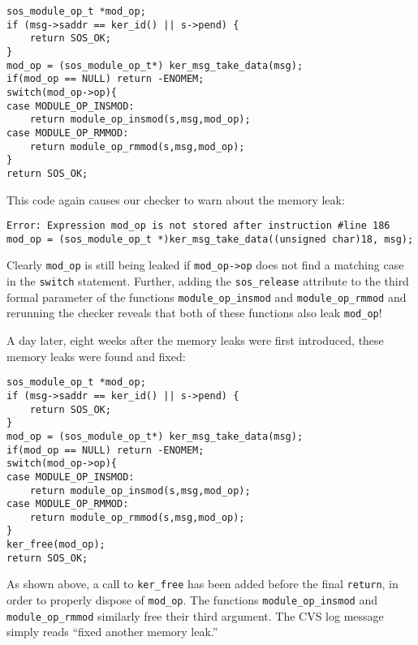 \begin{footnotesize}
\begin{verbatim}
sos_module_op_t *mod_op;
if (msg->saddr == ker_id() || s->pend) {
    return SOS_OK;
}
mod_op = (sos_module_op_t*) ker_msg_take_data(msg);
if(mod_op == NULL) return -ENOMEM;
switch(mod_op->op){
case MODULE_OP_INSMOD:
    return module_op_insmod(s,msg,mod_op);
case MODULE_OP_RMMOD:
    return module_op_rmmod(s,msg,mod_op);
}
return SOS_OK;
\end{verbatim}
\end{footnotesize}

This code again causes our checker to warn about the memory leak:

\begin{footnotesize}
\begin{verbatim}
Error: Expression mod_op is not stored after instruction #line 186
mod_op = (sos_module_op_t *)ker_msg_take_data((unsigned char)18, msg);
\end{verbatim}
\end{footnotesize}

Clearly {\tt mod\_op} is still being leaked if {\tt mod\_op->op} does
not find a matching case in the {\tt switch} statement.  Further,
adding the {\tt sos\_release} attribute to the third formal parameter
of the functions {\tt module\_op\_insmod} and {\tt module\_op\_rmmod}
and rerunning the checker reveals that both of these functions also
leak {\tt mod\_op}!

A day later, eight weeks after the memory leaks were first introduced,
these memory leaks were found and fixed:

\begin{footnotesize}
\begin{verbatim}
sos_module_op_t *mod_op;
if (msg->saddr == ker_id() || s->pend) {
    return SOS_OK;
}
mod_op = (sos_module_op_t*) ker_msg_take_data(msg);
if(mod_op == NULL) return -ENOMEM;
switch(mod_op->op){
case MODULE_OP_INSMOD:
    return module_op_insmod(s,msg,mod_op);
case MODULE_OP_RMMOD:
    return module_op_rmmod(s,msg,mod_op);
}
ker_free(mod_op);
return SOS_OK;
\end{verbatim}
\end{footnotesize}

As shown above, a call to {\tt ker\_free} has been added before the
final {\tt return}, in order to properly dispose of {\tt mod\_op}.
The functions {\tt module\_op\_insmod} and {\tt module\_op\_rmmod}
similarly free their third argument.  The CVS log message simply reads
``fixed another memory leak.''





